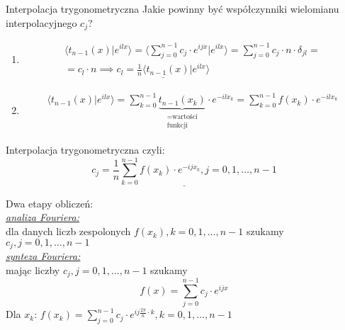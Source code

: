 \begin{frame}{Interpolacja trygonometryczna}
	Jakie powinny być współczynniki wielomianu interpolacyjnego $c_j$?
	
	\begin{enumerate}[1$^\circ$]
		\item
		\begin{align*}
			\langle t_{n-1}(x)|e^{ilx} \rangle = \Bigg\langle \sum\limits_{j = 0}^{n-1} c_j \cdot e^{ijx} \Bigg|e^{ilx} \Bigg\rangle = \sum\limits_{j = 0}^{n-1} c_j \cdot n \cdot \delta_{jl} = \\ = c_l \cdot n \implies \underline{c_l = \frac{1}{n} \langle t_{n-1}(x)|e^{ilx} \rangle}
		\end{align*}
		\item
		\begin{align*}
			\langle t_{n-1}(x)|e^{ilx} \rangle= \sum\limits_{k = 0}^{n-1}  \underbrace{t_{n-1}(x_k)}_{\substack{\text{=wartości} \\  \text{funkcji}}} \cdot e^{-ilx_k} =  \sum\limits_{k = 0}^{n-1} f(x_k) \cdot e^{-ilx_k} 
		\end{align*}
	\end{enumerate}
\end{frame}
\begin{frame}{Interpolacja trygonometryczna}	
 czyli:
	\[
		\underline{c_j = \frac{1}{n} \sum\limits_{k = 0}^{n-1} f(x_k) \cdot e^{-ijx_k}, j = 0, 1, \dots, n-1}
	\]
	\begin{flushleft}
		Dwa etapy obliczeń: \\
		\underline{\textit{analiza Fouriera:}} \\
		dla danych liczb zespolonych $f(x_k), k = 0, 1,\dots, n - 1$ szukamy $c_j, j = 0, 1, \dots, n-1$ \\
		\underline{\textit{synteza Fouriera:}} \\
		mając liczby $c_j, j = 0, 1, \dots, n-1$ szukamy
        \[
		  f(x) = \sum\limits_{j = 0}^{n - 1} c_j \cdot e^{ijx}
		\]
   Dla $x_k$: $f(x_k) = \sum\limits_{j = 0}^{n - 1} c_j \cdot e^{ij\frac{2\pi}{n} \cdot k}, k = 0, 1, \dots, n-1 $
	\end{flushleft}
	\end{frame}

